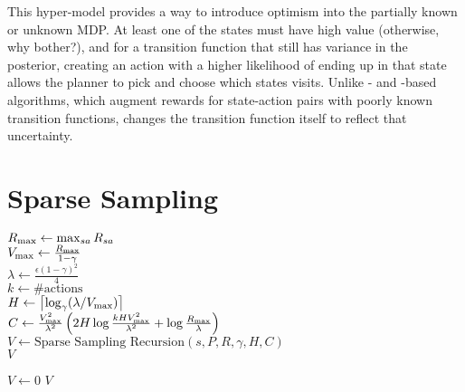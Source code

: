 This hyper-model provides a way to introduce optimism into the partially known or unknown MDP. At least one of the states must have high value (otherwise, why bother?), and for a transition function that still has variance in the posterior, creating an action with a higher likelihood of ending up in that state allows the planner to pick and choose which states visits. Unlike - and -based algorithms, which augment rewards for state-action pairs with poorly known transition functions,  changes the transition function itself to reflect that uncertainty.



\section{Sparse Sampling}

\label{sec:rel:ss}

\begin{algorithm}[tb]
	\caption{$\mbox{Sparse~Sampling}(s, P, R, \gamma, \epsilon, \delta)$}
	\label{alg:ss}
	$R_{\rm max} \leftarrow \max_{sa}R_{sa}$\\
	$V_{\rm max} \leftarrow \frac{R_{\rm max}}{1-\gamma}$\\
	$\lambda \leftarrow \frac{\epsilon(1-\gamma)^2} 4$\\
	$k \leftarrow \#\mbox{actions}$\\
	$H \leftarrow \left\lceil\log_\gamma(\lambda/V_{\rm max})\right\rceil$\\
	$C \leftarrow \frac {V_{\rm max}^2}{\lambda^2}\left(2H\log\frac{kHV_{\rm max}^2}{\lambda^2}+\log\frac{R_{\rm max}}{\lambda}\right)$\\
	$V \leftarrow \mbox{Sparse~Sampling~Recursion}(s, P, R, \gamma, H, C)$\\
	\Return $V$
\end{algorithm}

\begin{algorithm}[tb]
	\caption{$\mbox{Sparse~Sampling~Recursion}(s, P, R, \gamma, d, C)$}
	\label{alg:ssr}
	 {
		$V \leftarrow 0$
	}
	\Return $V$
\end{algorithm}

